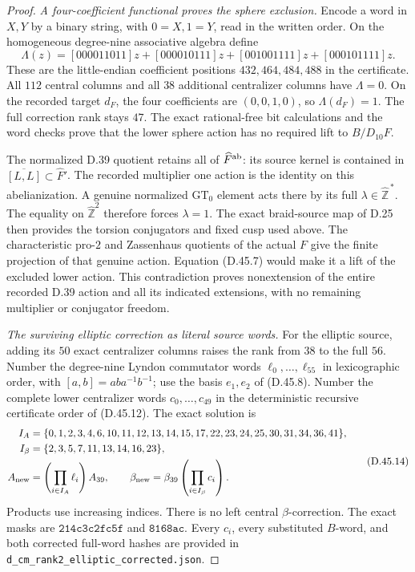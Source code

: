 \begin{proof}
\emph{A four-coefficient functional proves the sphere exclusion.}
Encode a word in \(X,Y\)
by a binary string, with
\(0=X,1=Y\), read in
the written order.
On the homogeneous
degree-nine associative
algebra define
\[
 \Lambda(z)=
 [000011011]z+[000010111]z
       +[001001111]z+[000101111]z.                             \tag{D.45.13}
\]
These are the little-endian
coefficient positions
\(432,464,484,488\)
in the certificate.
All \(112\) central
columns and all \(38\)
additional centralizer
columns have
\(\Lambda=0\).
On the recorded
target \(d_F\), the
four coefficients are
\((0,0,1,0)\), so
\(\Lambda(d_F)=1\).
The full correction
rank stays \(47\).
The exact rational-free
bit calculations and
the word checks prove
that the lower sphere
action has no required
lift to \(B/D_{10}F\).

The normalized D.39
quotient retains all
of \(\widehat F^{\rm ab}\):
its source kernel is
contained in
\(\overline{[L,L]}
\subset\widehat F'\).
The recorded multiplier
one action is the
identity on this
abelianization.
A genuine normalized
\(\widehat{\mathrm{GT}}_0\)
element acts there
by its full
\(\lambda\in\widehat{\mathbb Z}^{\,*}\).
The equality on
\(\widehat{\mathbb Z}^2\)
therefore forces
\(\lambda=1\).
The exact braid-source
map of D.25 then
provides the torsion
conjugators and fixed
cusp used above.
The characteristic
pro-\(2\) and
Zassenhaus quotients
of the actual \(F\)
give the finite
projection of that
genuine action.
Equation (D.45.7)
would make it a
lift of the excluded
lower action.
This contradiction
proves nonextension
of the entire
recorded D.39 action
and all its indicated
extensions, with
no remaining
multiplier or
conjugator freedom.

\emph{The surviving elliptic correction as literal source words.}
For the elliptic source,
adding its \(50\) exact
centralizer columns
raises the rank from
\(38\) to the full
\(56\). Number the
degree-nine Lyndon
commutator words
\(\ell_0,\ldots,\ell_{55}\)
in lexicographic order,
with
\([a,b]=aba^{-1}b^{-1}\);
use the basis \(e_1,e_2\)
of (D.45.8).
Number the complete
lower centralizer words
\(c_0,\ldots,c_{49}\)
in the deterministic
recursive certificate
order of (D.45.12).
The exact solution is
\[
 \begin{split}
 I_A&=\{0,1,2,3,4,6,10,11,12,13,14,15,
                         17,22,23,24,25,30,31,34,36,41\},\\
 I_\beta&=\{2,3,5,7,11,13,14,16,23\},\\
 A_{\rm new}&=\left(\prod_{i\in I_A}\ell_i\right)A_{39},
       \qquad
 \beta_{\rm new}=\beta_{39}
                           \left(\prod_{i\in I_\beta}c_i\right).
 \end{split}                                                   \tag{D.45.14}
\]
Products use increasing indices.
There is no left central
\(\beta\)-correction.
The exact masks are
\(\mathtt{214c3c2fc5f}\)
and \(\mathtt{8168ac}\).
Every \(c_i\), every
substituted \(B\)-word,
and both corrected
full-word hashes are
provided in
\texttt{d\_cm\_rank2\_elliptic\_corrected.json}.


\end{proof}
